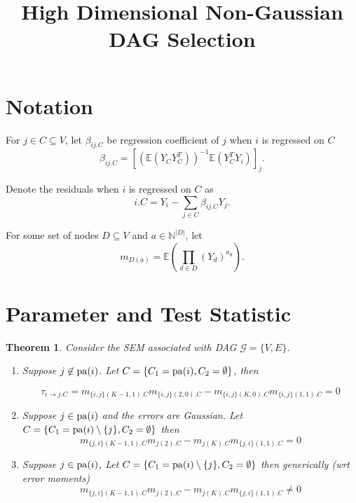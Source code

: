 \documentclass[]{article}
\title{High Dimensional Non-Gaussian DAG Selection}
\author{}
\newtheorem{theorem}{Theorem}
\newcommand{\E}{\mathbb{E}}
\newcommand{\pa}{{\rm pa}}       %
\begin{document}
\maketitle




\section{Notation}

For $j \in C \subseteq V$, let $\beta_{ij.C}$ be regression coefficient of $j$ when $i$ is regressed on $C$
\[\beta_{ij.C} = \left[\left(\E\left(Y_{C}Y_{C}^T\right)\right)^{-1} \E(Y_{C}^T Y_i)\right]_j.\]

Denote the residuals when $i$ is regressed on $C$ as
\[i.C = Y_i - \sum_{j \in C}\beta_{ij.C}Y_j.\]

For some set of nodes $D \subseteq V$ and $a \in \mathbb{N}^{|D|}$, let
\[m_{D(a)} = \E\left(\prod_{d \in D} (Y_d)^{a_d}\right).\]



\section{Parameter and  Test Statistic}
\begin{theorem}
Consider the SEM associated with DAG $\mathcal{G} = \{V, E\}$.  
\begin{enumerate}
\item[(1)]
Suppose $j \not\in \pa(i)$. Let $C = \{C_1 =\pa(i), C_2 = \emptyset\}$, then 

\[\tau _{i\rightarrow j.C} =  m_{\{i,j\}(K-1,1).C} m_{\{i,j\}(2,0).C} - m_{\{i,j\}(K,0).C}m_{\{i,j\}(1,1).C} = 0 \]

\item[(2)] Suppose $j \in \pa(i)$ and the errors are Gaussian. Let $C = \{C_1 =\pa(i)\setminus \{j\}, C_2 = \emptyset\}$ then
\[m_{\{j,i\}(K-1,1).C} m_{j(2).C} - m_{j(K).C}m_{\{j,i\}(1,1).C} = 0 \]


\item[(3)] Suppose $j \in \pa(i)$, Let $C = \{C_1 =\pa(i)\setminus \{j\}, C_2 = \emptyset\}$ then generically (wrt error moments)
\[m_{\{j,i\}(K-1,1).C} m_{j(2).C} - m_{j(K).C}m_{\{j,i\}(1,1).C} \neq 0 \]


\end{enumerate}
\end{theorem}
\end{document}
